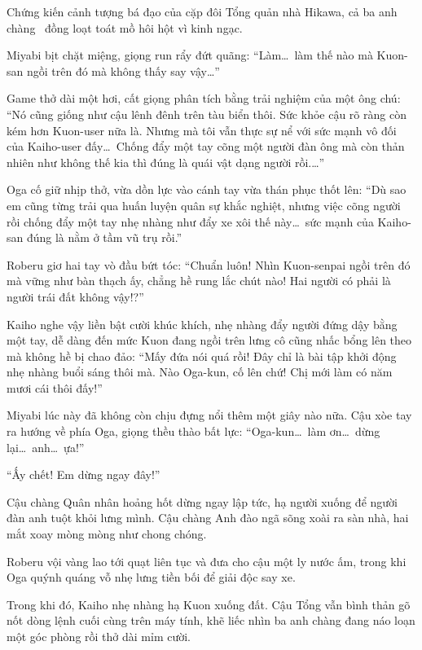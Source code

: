 \documentclass[../main.tex]{subfiles}
\begin{document}
Chứng kiến cảnh tượng bá đạo của cặp đôi Tổng quản nhà Hikawa, cả ba anh chàng \hll\ đồng loạt toát mồ hôi hột vì kinh ngạc.

Miyabi bịt chặt miệng, giọng run rẩy đứt quãng: ``Làm\dots\ làm thế nào mà Kuon-san ngồi trên đó mà không thấy say vậy\dots''

Game thở dài một hơi, cất giọng phân tích bằng trải nghiệm của một ông chú: ``Nó cũng giống như cậu lênh đênh trên tàu biển thôi. Sức khỏe cậu rõ ràng còn kém hơn Kuon-user nữa là. Nhưng mà tôi vẫn thực sự nể với sức mạnh vô đối của Kaiho-user đấy\dots\ Chống đẩy một tay cõng một người đàn ông mà còn thản nhiên như không thế kia thì đúng là quái vật dạng người rồi.\dots''

Oga cố giữ nhịp thở, vừa dồn lực vào cánh tay vừa thán phục thốt lên: ``Dù sao em cũng từng trải qua huấn luyện quân sự khắc nghiệt, nhưng việc cõng người rồi chống đẩy một tay nhẹ nhàng như đẩy xe xôi thế này\dots\ sức mạnh của Kaiho-san đúng là nằm ở tầm vũ trụ rồi.''

Roberu giơ hai tay vò đầu bứt tóc: ``Chuẩn luôn! Nhìn Kuon-senpai ngồi trên đó mà vững như bàn thạch ấy, chẳng hề rung lắc chút nào! Hai người có phải là người trái đất không vậy!?''

Kaiho nghe vậy liền bật cười khúc khích, nhẹ nhàng đẩy người đứng dậy bằng một tay, dễ dàng đến mức Kuon đang ngồi trên lưng cô cũng nhấc bổng lên theo mà không hề bị chao đảo: ``Mấy đứa nói quá rồi! Đây chỉ là bài tập khởi động nhẹ nhàng buổi sáng thôi mà. Nào Oga-kun, cố lên chứ! Chị mới làm có năm mươi cái thôi đấy!''

Miyabi lúc này đã không còn chịu đựng nổi thêm một giây nào nữa. Cậu xòe tay ra hướng về phía Oga, giọng thều thào bất lực: ``Oga-kun\dots\ làm ơn\dots\ dừng lại\dots\ anh\dots\ ựa!''

``Ấy chết! Em dừng ngay đây!''

Cậu chàng Quân nhân hoảng hốt dừng ngay lập tức, hạ người xuống để người đàn anh tuột khỏi lưng mình. Cậu chàng Anh đào ngã sõng xoài ra sàn nhà, hai mắt xoay mòng mòng như chong chóng.

Roberu vội vàng lao tới quạt liên tục và đưa cho cậu một ly nước ấm, trong khi Oga quýnh quáng vỗ nhẹ lưng tiền bối để giải độc say xe.

Trong khi đó, Kaiho nhẹ nhàng hạ Kuon xuống đất. Cậu Tổng vẫn bình thản gõ nốt dòng lệnh cuối cùng trên máy tính, khẽ liếc nhìn ba anh chàng đang náo loạn một góc phòng rồi thở dài mỉm cười.

\newpage
\end{document}
